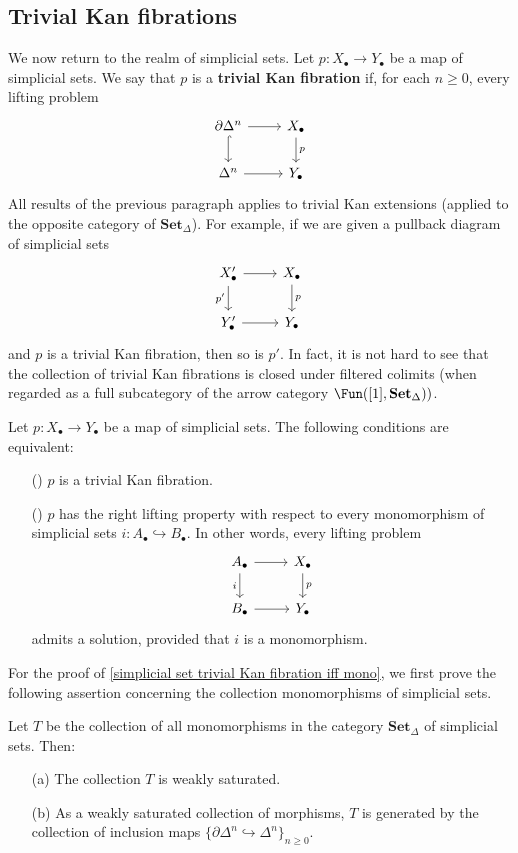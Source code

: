 \subsection{Trivial Kan fibrations}
We now return to the realm of simplicial sets. Let $p:X_\bullet\to Y_\bullet$ be a map of simplicial sets. We say that $p$ is a \textbf{trivial Kan fibration} if, for each $n\geq 0$, every lifting problem
\[\begin{tikzcd}
\partial\Delta^n\ar[r]\ar[d,hook]&X_\bullet\ar[d,"p"]\\
\Delta^n\ar[r]&Y_\bullet
\end{tikzcd}\]
All results of the previous paragraph applies to trivial Kan extensions (applied to the opposite category of $\mathbf{Set}_\Delta$). For example, if we are given a pullback diagram of simplicial sets
\[\begin{tikzcd}
X'_\bullet\ar[r]\ar[d,swap,"p'"]&X_\bullet\ar[d,"p"]\\
Y'_\bullet\ar[r]&Y_\bullet
\end{tikzcd}\]
and $p$ is a trivial Kan fibration, then so is $p'$. In fact, it is not hard to see that the collection of trivial Kan fibrations is closed under filtered colimits (when regarded as a full subcategory of the arrow category $\Fun([1],\mathbf{Set}_\Delta))$.
\begin{proposition}\label{simplicial set trivial Kan fibration iff mono}
Let $p:X_\bullet\to Y_\bullet$ be a map of simplicial sets. The following conditions are equivalent:
\begin{itemize}
\item[(\rmnum{1})] $p$ is a trivial Kan fibration.
\item[(\rmnum{2})] $p$ has the right lifting property with respect to every monomorphism of simplicial sets $i:A_\bullet\hookrightarrow B_\bullet$. In other words, every lifting problem
\[\begin{tikzcd}
A_\bullet\ar[r]\ar[d,swap,"i"]&X_\bullet\ar[d,"p"]\\
B_\bullet\ar[r]&Y_\bullet
\end{tikzcd}\] 
admits a solution, provided that $i$ is a monomorphism.
\end{itemize}
\end{proposition}
For the proof of \cref{simplicial set trivial Kan fibration iff mono}, we first prove the following assertion concerning the collection monomorphisms of simplicial sets.
\begin{proposition}\label{simplicial set monomorphism weakly saturated}
Let $T$ be the collection of all monomorphisms in the category $\mathbf{Set}_\Delta$ of simplicial sets. Then:
\begin{itemize}
\item[(a)] The collection $T$ is weakly saturated.
\item[(b)] As a weakly saturated collection of morphisms, $T$ is generated by the collection of inclusion maps $\{\partial\Delta^n\hookrightarrow\Delta^n\}_{n\geq 0}$.
\end{itemize}
\end{proposition}
